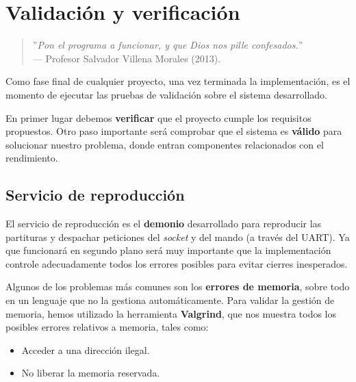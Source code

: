 \chapter{Validación y verificación}
\label{cap:capitulo6}

\begin{quote}
	\begin{flushright}
		\small ''\textit{Pon el programa a funcionar, y que Dios nos pille confesados.}'' \\
		--- Profesor Salvador Villena Morales (2013).
	\end{flushright}
\end{quote}

\vspace{8em}

Como fase final de cualquier proyecto, una vez terminada la implementación, es el momento de ejecutar las pruebas de validación sobre el sistema desarrollado.

En primer lugar debemos \textbf{verificar} que el proyecto cumple los requisitos propuestos. Otro paso importante será comprobar que el sistema es \textbf{válido} para solucionar nuestro problema, donde entran componentes relacionados con el rendimiento.

\newpage

\section{Servicio de reproducción}

El servicio de reproducción es el \textbf{demonio} desarrollado para reproducir las partituras y despachar peticiones del \textit{socket} y del mando (a través del \acrshort{UART}). Ya que funcionará en segundo plano será muy importante que la implementación controle adecuadamente todos los errores posibles para evitar cierres inesperados.

Algunos de los problemas más comunes son los \textbf{errores de memoria}, sobre todo en un lenguaje que no la gestiona automáticamente. Para validar la gestión de memoria, hemos utilizado la herramienta \textbf{Valgrind}, que nos muestra todos los posibles errores relativos a memoria, tales como:

\begin{itemize}
	\item Acceder a una dirección ilegal.
	\item No liberar la memoria reservada.
\end{itemize}

